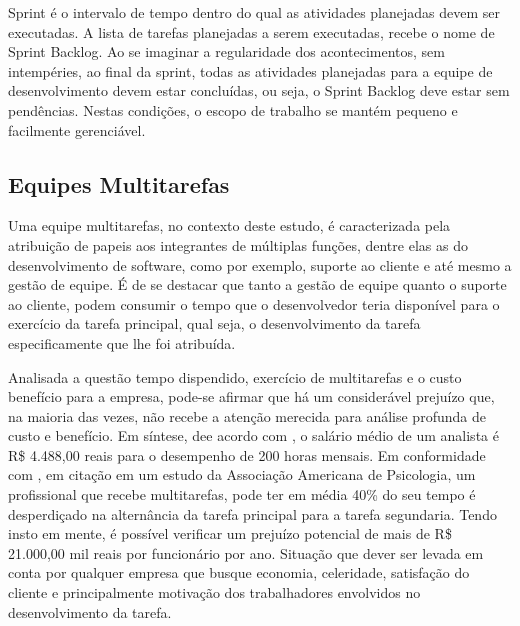 Sprint é o intervalo de tempo dentro do qual as atividades planejadas devem ser executadas. A lista de tarefas planejadas a serem executadas, recebe o nome de Sprint Backlog. Ao se imaginar a regularidade dos acontecimentos, sem intempéries, ao final da sprint, todas as atividades planejadas para a equipe de desenvolvimento devem estar concluídas, ou seja, o Sprint Backlog deve estar sem pendências. Nestas condições, o escopo de trabalho se mantém pequeno e facilmente gerenciável.

\subsection{Equipes Multitarefas}
Uma equipe multitarefas, no contexto deste estudo, é caracterizada pela atribuição de papeis aos integrantes de múltiplas funções, dentre elas as do desenvolvimento de software, como por exemplo, suporte ao cliente e até mesmo a gestão de equipe. É de se destacar que tanto a gestão de equipe quanto o suporte ao cliente, podem consumir o tempo que o desenvolvedor teria disponível para o exercício da tarefa principal, qual seja, o desenvolvimento da tarefa especificamente  que lhe foi atribuída. \par
Analisada a questão tempo dispendido, exercício de multitarefas e o custo benefício para a empresa, pode-se afirmar que há um considerável prejuízo que, na maioria das vezes, não recebe a atenção merecida para análise profunda de custo e benefício. Em síntese, dee acordo com , o salário médio de um analista é R\$ 4.488,00 reais para o desempenho de 200 horas mensais. Em conformidade com , em citação em um estudo da Associação Americana de Psicologia, um profissional que recebe multitarefas, pode ter em média 40\% do seu tempo é desperdiçado na alternância da tarefa principal para a tarefa segundaria. Tendo insto em mente, é possível verificar um prejuízo potencial de mais de R\$ 21.000,00 mil reais por funcionário por ano. Situação que dever ser levada em conta por qualquer empresa que busque economia, celeridade, satisfação do cliente e principalmente motivação dos trabalhadores envolvidos no desenvolvimento da tarefa.

